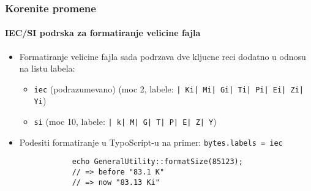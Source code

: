 \begin{frame}[fragile]
	\frametitle{Korenite promene}
	\framesubtitle{IEC/SI podrska za formatiranje velicine fajla}


	\begin{itemize}

		\item Formatiranje velicine fajla sada podrzava dve kljucne reci dodatno u odnosu na listu labela:

			\begin{itemize}
				\item \small\texttt{iec} (podrazumevano)\newline
					\small(moc 2, labele: \texttt{| Ki| Mi| Gi| Ti| Pi| Ei| Zi| Yi})\normalsize
				\item \small\texttt{si}\newline
					\small(moc 10, labele: \texttt{| k| M| G| T| P| E| Z| Y})\normalsize
			\end{itemize}

		\item Podesiti formatiranje u TypoScript-u na primer:\newline
			\texttt{bytes.labels = iec}

		\begin{lstlisting}
			echo GeneralUtility::formatSize(85123);
			// => before "83.1 K"
			// => now "83.13 Ki"
		\end{lstlisting}

	\end{itemize}

\end{frame}


